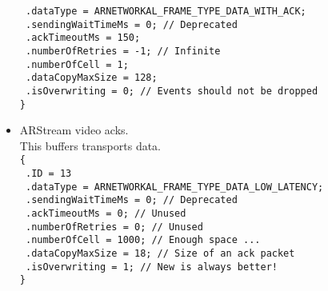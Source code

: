 \begin{itemize}
{    \texttt{  .dataType = ARNETWORKAL\_FRAME\_TYPE\_DATA\_WITH\_ACK;}\\
    \texttt{  .sendingWaitTimeMs = 0; // Deprecated}\\
    \texttt{  .ackTimeoutMs = 150;}\\
    \texttt{  .numberOfRetries = -1; // Infinite}\\
    \texttt{  .numberOfCell = 1;}\\
    \texttt{  .dataCopyMaxSize = 128;}\\
    \texttt{  .isOverwriting = 0; // Events should not be dropped}\\
    \texttt{\}}
}
\item{
    ARStream video acks.\\
    This buffers transports  data.\\
    \texttt{\{}\\
    \texttt{  .ID = 13}\\
    \texttt{  .dataType = ARNETWORKAL\_FRAME\_TYPE\_DATA\_LOW\_LATENCY;}\\
    \texttt{  .sendingWaitTimeMs = 0; // Deprecated}\\
    \texttt{  .ackTimeoutMs = 0; // Unused}\\
    \texttt{  .numberOfRetries = 0; // Unused}\\
    \texttt{  .numberOfCell = 1000; // Enough space ...}\\
    \texttt{  .dataCopyMaxSize = 18; // Size of an ack packet}\\
    \texttt{  .isOverwriting = 1; // New is always better!}\\
    \texttt{\}}
}
\end{itemize}


